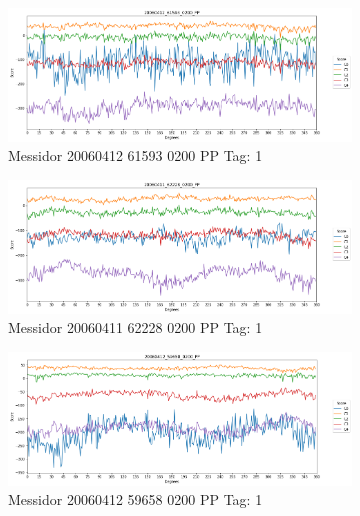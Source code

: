 \begin{figure}[ht!]
	\centering
	\begin{subfigure}[b]{ 0.85\textwidth}
		\centering
		\includegraphics[width=\textwidth]{Figures/chapter_stability/20060412_61593_0200_PP/r/scores.png}
		\caption{Messidor 20060412 61593 0200 PP Tag: 1}
	\end{subfigure}
	\begin{subfigure}[b]{ 0.85\textwidth}
		\centering
		\includegraphics[width=\textwidth]{Figures/chapter_stability/20060411_62228_0200_PP/r/scores.png}
		\caption{Messidor 20060411 62228 0200 PP Tag: 1}		
	\end{subfigure}	
	\begin{subfigure}[b]{ 0.85\textwidth}
		\centering
		\includegraphics[width=\textwidth]{Figures/chapter_stability/20060412_59658_0200_PP/r/scores.png}
		\caption{Messidor 20060412 59658 0200 PP Tag: 1}		
	\end{subfigure}
	\begin{subfigure}[b]{ 0.85\textwidth}

\end{subfigure}
\end{figure}
